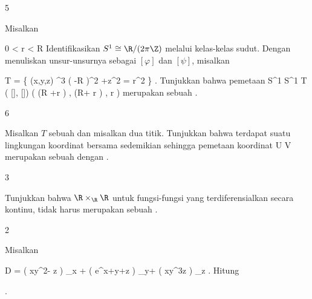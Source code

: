 
{5}
{

Misalkan

\mavergleichskette
{\vergleichskette
{ 0
}
{ < }{ r
}
{ < }{ R
}
{    }{
}
{   }{
}
}
{}{}{}
Identifikasikan $S^1 \cong \R/(2\pi\Z)$ melalui kelas-kelas sudut. Dengan menuliskan unsur-unsurnya sebagai $[\varphi]$ dan $[\psi]$, misalkan

\mavergleichskettedisp
{\vergleichskette
{ T
}
{ =} { \left\{ (x,y,z) \in \R^3  \mid   \left(   -R  \right)^2 +z^2 = r^2         \right\}
}
{ } {
}
{ } {
}
{ } {
}
}
{}{}{.}
Tunjukkan bahwa pemetaan
\maabbeledisp {} { S^1 \times S^1 } { T
} { ( [\varphi], [\psi]) } {( (R +r \cos  \psi) \cos \varphi, (R+ r \cos  \psi ) \sin \varphi ,  r \sin  \psi )
} {}
merupakan sebuah
.

}
{} {}

{6}
{

Misalkan $T$ sebuah
dan misalkan
 dua titik. Tunjukkan bahwa terdapat suatu lingkungan koordinat bersama
 sedemikian sehingga pemetaan koordinat
\maabbdisp {\alpha} { U } { V
} {}
merupakan sebuah
dengan
\mathl{V= {]0,1[} \times  {]0,1[}}{}.

}
{} {}

{3}
{

Tunjukkan bahwa
$\R \times_\R \R$ untuk fungsi-fungsi yang terdiferensialkan secara kontinu,
 {\R} {\R
} {}
tidak harus merupakan sebuah
.

}
{} {}

{2}
{

Misalkan

\mavergleichskettedisp
{\vergleichskette
{ D
}
{ =} { \left(  xy^2-  \sin z  \right)  \partial_x +  \left(  e^{x+y+z}  \right) \partial_y+  \left(  xy^3z  \right) \partial_z
}
{ } {
}
{ } {
}
{ } {
}
}
{}{}{.}
Hitung

 { . }

}
{} {}

